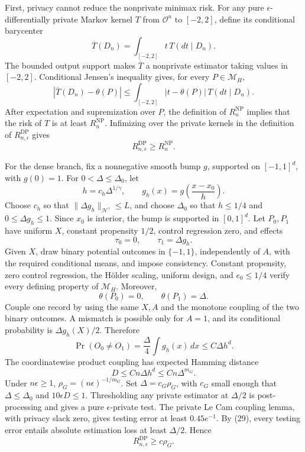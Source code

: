 First, privacy cannot reduce the nonprivate minimax risk.  For any pure \(\epsilon\)-differentially private Markov kernel \(T\) from \(\mathcal O^n\) to \([-2,2]\), define its conditional barycenter
\[
 \overline T(D_n)=\int_{[-2,2]}t\,T(dt\mid D_n).
\]
The bounded output support makes \(\overline T\) a nonprivate estimator taking values in \([-2,2]\).  Conditional Jensen's inequality gives, for every \(P\in\mathcal M_H\),
\[
 |\overline T(D_n)-\theta(P)|
 \le\int_{[-2,2]}|t-\theta(P)|\,T(dt\mid D_n).
\]
After expectation and supremization over \(P\), the definition of \(R_n^{\mathrm{NP}}\) implies that the risk of \(T\) is at least \(R_n^{\mathrm{NP}}\).  Infimizing over the private kernels in the definition of \(R_{n,\epsilon}^{\mathrm{DP}}\) gives
\[
 R_{n,\epsilon}^{\mathrm{DP}}\ge R_n^{\mathrm{NP}}.
 \tag{28}
\]

For the dense branch, fix a nonnegative smooth bump \(g\), supported on \([-1,1]^d\), with \(g(0)=1\).  For \(0<\Delta\le\Delta_0\), let
\[
 h=c_h\Delta^{1/\gamma},\qquad
 g_h(x)=g\!\left(\frac{x-x_0}{h}\right).
\]
Choose \(c_h\) so that \(\|\Delta g_h\|_{\mathcal H^\gamma}\le L\), and choose \(\Delta_0\) so that \(h\le1/4\) and \(0\le\Delta g_h\le1\).  Since \(x_0\) is interior, the bump is supported in \([0,1]^d\).  Let \(P_0,P_1\) have uniform \(X\), constant propensity \(1/2\), control regression zero, and effects
\[
 \tau_0=0,\qquad \tau_1=\Delta g_h.
\]
Given \(X\), draw binary potential outcomes in \(\{-1,1\}\), independently of \(A\), with the required conditional means, and impose consistency.  Constant propensity, zero control regression, the Hölder scaling, uniform design, and \(e_0\le1/4\) verify every defining property of \(\mathcal M_H\).  Moreover,
\[
 \theta(P_0)=0,\qquad \theta(P_1)=\Delta.
 \tag{29}
\]
Couple one record by using the same \(X,A\) and the monotone coupling of the two binary outcomes.  A mismatch is possible only for \(A=1\), and its conditional probability is \(\Delta g_h(X)/2\).  Therefore
\[
 \Pr(O_0\ne O_1)
 =\frac{\Delta}{4}\int g_h(x)\,dx
 \le C\Delta h^d.
\]
The coordinatewise product coupling has expected Hamming distance
\[
 D\le Cn\Delta h^d\le Cn\Delta^{m_G}.
 \tag{30}
\]
Under \(n\epsilon\ge1\), \(\rho_G=(n\epsilon)^{-1/m_G}\).  Set \(\Delta=c_G\rho_G\), with \(c_G\) small enough that \(\Delta\le\Delta_0\) and \(10\epsilon D\le1\).  Thresholding any private estimator at \(\Delta/2\) is post-processing and gives a pure \(\epsilon\)-private test.  The private Le Cam coupling lemma, with privacy slack zero, gives testing error at least \(0.45e^{-1}\).  By (29), every testing error entails absolute estimation loss at least \(\Delta/2\).  Hence
\[
 R_{n,\epsilon}^{\mathrm{DP}}\ge c\rho_G.
 \tag{31}
\]

